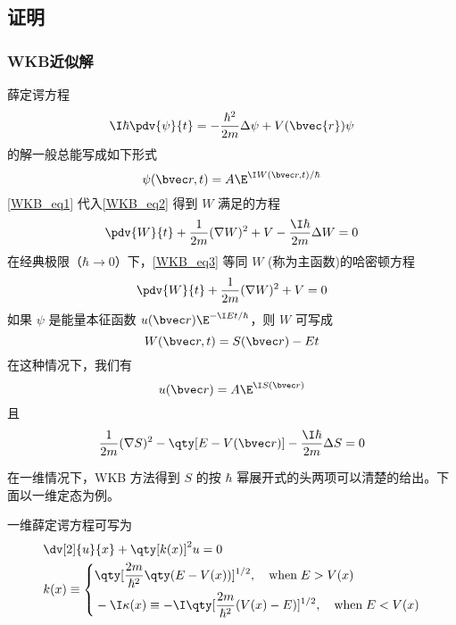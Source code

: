 \subsection{证明}
\subsubsection{WKB近似解}
薛定谔方程
\begin{equation}\label{WKB_eq2}
\I\hbar\pdv{\psi}{t}=-\frac{\hbar^2}{2m}\Delta\psi+V(\bvec{r})\psi
\end{equation}
的解一般总能写成如下形式
\begin{equation}\label{WKB_eq1}
\psi(\bvec r,t)=A\E^{\I W(\bvec r,t)/\hbar}
\end{equation}
\autoref{WKB_eq1} 代入\autoref{WKB_eq2} 得到 $W$ 满足的方程
\begin{equation}\label{WKB_eq3}
\pdv{W}{t}+\frac{1}{2m}(\nabla W)^2+V-\frac{\I\hbar}{2m}\Delta W=0
\end{equation}
在经典极限（$\hbar\rightarrow 0$）下，\autoref{WKB_eq3} 等同 $W$ (称为主函数)的哈密顿方程
\begin{equation}
\pdv{W}{t}+\frac{1}{2m}(\nabla W)^2+V=0
\end{equation}
如果 $\psi$ 是能量本征函数 $u(\bvec r)\E^{-\I Et/\hbar}$，则 $W$ 可写成
\begin{equation}
W(\bvec r,t)=S(\bvec r)-Et
\end{equation}
在这种情况下，我们有
\begin{equation}
u(\bvec r)=A\E^{\I S(\bvec r)}
\end{equation}
且
\begin{equation}
\frac{1}{2m}(\nabla S)^2-\qty[E-V(\bvec r)]-\frac{\I\hbar}{2m}\Delta S=0
\end{equation}

在一维情况下，WKB 方法得到 $S$ 的按 $\hbar$ 幂展开式的头两项可以清楚的给出。下面以一维定态为例。

一维薛定谔方程可写为\cite{Sakurai}
\begin{equation}\label{WKB_eq4}
\begin{aligned}
&\dv[2]{u}{x}+\qty[k(x)]^2u=0\\
&k(x)\equiv\left\{\begin{aligned}
&\qty[\frac{2m}{\hbar^2}\qty(E-V(x))]^{1/2},\quad \text{when}\; E>V(x)\\
&-\I\kappa(x)\equiv-\I\qty[\frac{2m}{\hbar^2}(V(x)-E)]^{1/2},\quad \text{when}\; E<V(x)
\end{aligned}\right.
\end{aligned}
\end{equation}

